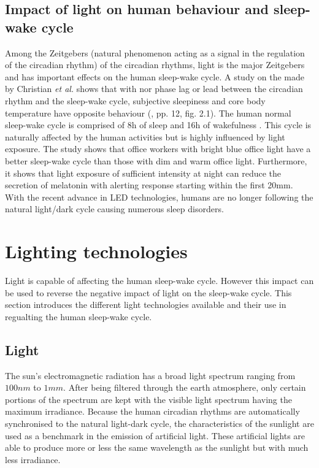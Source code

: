\subsection{Impact of light on human behaviour and sleep-wake cycle}
Among the Zeitgebers (natural phenomenon acting as a signal in the regulation of the circadian rhythm)  of the circadian rhythms, light is the major Zeitgebers and has important effects on the human sleep-wake cycle. A study on the  made by Christian \textit{et al.}\cite{cir2014} shows that with nor phase lag or lead between the circadian rhythm and the sleep-wake cycle, subjective sleepiness and core body temperature have opposite behaviour (\cite{cir2014}, pp. 12, fig. 2.1). The human normal sleep-wake cycle is comprised of 8h of sleep and 16h of wakefulness \cite{is1995}. This cycle is naturally affected by the human activities but is highly influenced by light exposure. The study shows that office workers with bright blue office light have a better sleep-wake cycle than those with dim and warm office light. Furthermore, it shows that light exposure of sufficient intensity at night can reduce the secretion of melatonin with alerting response starting within the first 20mm. With the recent advance in LED technologies, humans are no longer following the natural light/dark cycle causing numerous sleep disorders. 

  
\section{Lighting technologies}

Light is capable of affecting the human sleep-wake cycle. However this impact can be used to reverse the negative impact of light on the sleep-wake cycle. This section introduces the different light technologies available and their use in regualting the human sleep-wake cycle. 

\subsection{Light}
The sun's electromagnetic radiation has a broad light spectrum ranging from  $100nm$ to $1mm$. After being filtered through the earth atmosphere, only certain portions of the spectrum are kept with the visible light spectrum having the maximum irradiance. Because the human circadian rhythms are automatically synchronised to the natural light-dark cycle, the characteristics of the sunlight are used as a benchmark in the emission of artificial light. These artificial lights are able to produce more or less the same wavelength as the sunlight but with much less irradiance.

